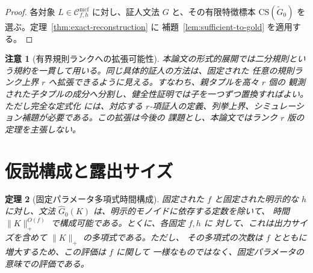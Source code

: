 \documentclass[11pt,a4paper]{ltjsarticle}
\newtheorem{theorem}{定理}[section]
\newtheorem{remark}[theorem]{注意}
\theoremstyle{remark}
\newcommand{\CS}{\mathrm{CS}}
\newcommand{\Cmcf}[2]{\mathcal{C}^{\mathrm{mcf}}_{#1,#2}}
\begin{document}
\begin{proof}
各対象 \(L\in\Cmcf{f}{h}\) に対し、証人文法 \(G\) と、その有限特徴標本
\(\CS(\widetilde G_0)\) を選ぶ。定理~\ref{thm:exact-reconstruction} に
補題~\ref{lem:sufficient-to-gold} を適用する。
\end{proof}

\begin{remark}[有界規則ランクへの拡張可能性]
\label{rem:bounded-rule-rank}
本論文の形式的展開では二分規則という規約を一貫して用いる。同じ具体的証人の方法は、固定された
任意の規則ランク上界 \(r\) へ拡張できるように見える。すなわち、親タプルを高々 \(r\) 個の
観測された子タプルの成分へ分割し、健全性証明では子を一つずつ置換すればよい。ただし完全な定式化
には、対応する \(r\)-項証人の定義、列挙上界、シミュレーション補題が必要である。この拡張は今後の
課題とし、本論文ではランク \(r\) 版の定理を主張しない。
\end{remark}


\section{仮説構成と露出サイズ}
\label{sec:poly-time}

\begin{theorem}[固定パラメータ多項式時間構成]
\label{thm:poly}
固定された \(f\) と固定された明示的な \(h\) に対し、文法
\(\widehat G_0(K)\) は、明示的モノイドに依存する定数を除いて、
時間 \(\|K\|_+^{O(f)}\) で構成可能である。とくに、各固定 \(f,h\) に
対して、これは出力サイズを含めて \(\|K\|_+\) の多項式である。ただし、
その多項式の次数は \(f\) とともに増大するため、この評価は \(f\) に関して
一様なものではなく、固定パラメータの意味での評価である。
\end{theorem}
\end{document}
